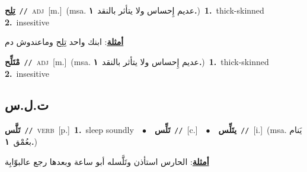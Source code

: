 \documentclass[10pt,a4paper,twoside]{article} %
\begin{document}
\begin{multicols}{2}
{\setlength\topsep{0pt}\textbf{\foreignlanguage{arabic}{تِلِح}}\ {\color{gray}\texttt{//}\color{black}}\ \textsc{adj}\ [m.]\ \color{gray}(msa. \foreignlanguage{arabic}{عديم إِحساس ولا يتأثر بالنقد}~\foreignlanguage{arabic}{\textbf{١.}})\color{black}\ \textbf{1.}~thick-skinned  \textbf{2.}~insesitive\  \begin{flushright}\color{gray}\foreignlanguage{arabic}{\textbf{\underline{\foreignlanguage{arabic}{أمثلة}}}: ابنك واحد تِلِح وماعندوش دم}\end{flushright}\color{black}} \vspace{2mm}

{\setlength\topsep{0pt}\textbf{\foreignlanguage{arabic}{مْتَلِّح}}\ {\color{gray}\texttt{//}\color{black}}\ \textsc{adj}\ [m.]\ \color{gray}(msa. \foreignlanguage{arabic}{عديم إِحساس ولا يتأثر بالنقد}~\foreignlanguage{arabic}{\textbf{١.}})\color{black}\ \textbf{1.}~thick-skinned  \textbf{2.}~insesitive\ } \vspace{2mm}

\vspace{-3mm}
\subsection*{\color{blue}\foreignlanguage{arabic}{ت.ل.س}\color{blue}{}} 

{\setlength\topsep{0pt}\textbf{\foreignlanguage{arabic}{تَلَّس}}\ {\color{gray}\texttt{//}\color{black}}\ \textsc{verb}\ [p.]\ \textbf{1.}~sleep soundly\ \ $\bullet$\ \ \setlength\topsep{0pt}\textbf{\foreignlanguage{arabic}{تَلِّس}}\ {\color{gray}\texttt{//}\color{black}}\ [c.]\ \ $\bullet$\ \ \setlength\topsep{0pt}\textbf{\foreignlanguage{arabic}{يتَلِّس}}\ {\color{gray}\texttt{//}\color{black}}\ [i.]\ \color{gray}(msa. \foreignlanguage{arabic}{يَنام بعُمْق}~\foreignlanguage{arabic}{\textbf{١.}})\color{black}\  \begin{flushright}\color{gray}\foreignlanguage{arabic}{\textbf{\underline{\foreignlanguage{arabic}{أمثلة}}}: الحارس استأذن وتَلَّسله أبو ساعة وبعدها رجع عالبوّابِة}\end{flushright}\color{black}} \vspace{2mm}


\end{multicols}
\end{document}
